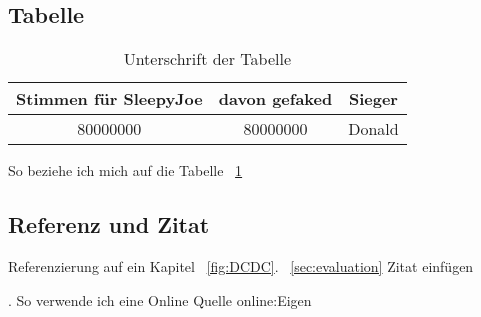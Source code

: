 \subsection{Tabelle}
\label{subsec:table}


\begin{table}[htb]
	\begin{center}
		\begin{tabular}[h]{c|c|c}	
			
			Stimmen für SleepyJoe & davon gefaked  & Sieger \\
			\hline
			80000000 & 80000000 & Donald \\
			\hline
		\end{tabular}
		\caption{Unterschrift  der Tabelle}
		\label{tab:Tabelle1}
	\end{center}
\end{table}

So beziehe ich mich auf die Tabelle ~\ref{tab:Tabelle1}


\subsection{Referenz und Zitat}
\label{subsec:refcite}
Referenzierung auf ein Kapitel ~\ref{fig:DCDC}. ~\ref{sec:evaluation}
Zitat einfügen

\cite{stinyAktiveElektronischeBauelemente2019}.
So verwende ich eine Online Quelle \gls{online:Eigen}
